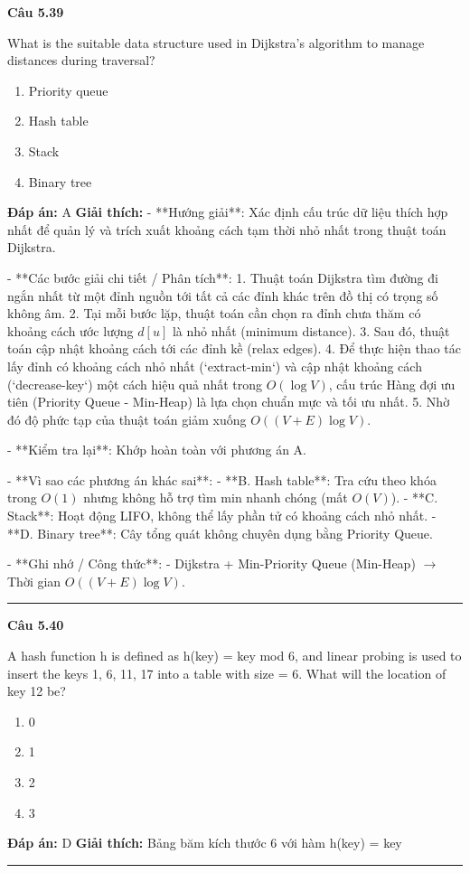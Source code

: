 \documentclass[11pt,a4paper]{article}
\newenvironment{question}[1]{%
  \par\vspace{1em}\noindent\textbf{\large Câu #1}\par\vspace{0.4em}
}{%
  \par\vspace{1em}\hrule\vspace{0.6em}
}
\newenvironment{choices}{%
  \begin{enumerate}[label=\textbf{\Alph*.},leftmargin=2.2em,itemsep=2pt,topsep=3pt]
}{%
  \end{enumerate}
}
\newcommand{\choice}{\item}
\begin{document}
\begin{question}{5.39}
What is the suitable data structure used in Dijkstra's algorithm to manage distances during traversal?
\begin{choices}
\choice Priority queue
\choice Hash table
\choice Stack
\choice Binary tree
\end{choices}
\textbf{Đáp án:} A
\textbf{Giải thích:} - **Hướng giải**:
  Xác định cấu trúc dữ liệu thích hợp nhất để quản lý và trích xuất khoảng cách tạm thời nhỏ nhất trong thuật toán Dijkstra.

- **Các bước giải chi tiết / Phân tích**:
  1. Thuật toán Dijkstra tìm đường đi ngắn nhất từ một đỉnh nguồn tới tất cả các đỉnh khác trên đồ thị có trọng số không âm.
  2. Tại mỗi bước lặp, thuật toán cần chọn ra đỉnh chưa thăm có khoảng cách ước lượng \(d[u]\) là nhỏ nhất (minimum distance).
  3. Sau đó, thuật toán cập nhật khoảng cách tới các đỉnh kề (relax edges).
  4. Để thực hiện thao tác lấy đỉnh có khoảng cách nhỏ nhất (`extract-min`) và cập nhật khoảng cách (`decrease-key`) một cách hiệu quả nhất trong \(O(\log V)\), cấu trúc Hàng đợi ưu tiên (Priority Queue - Min-Heap) là lựa chọn chuẩn mực và tối ưu nhất.
  5. Nhờ đó độ phức tạp của thuật toán giảm xuống \(O((V + E) \log V)\).

- **Kiểm tra lại**:
  Khớp hoàn toàn với phương án A.

- **Vì sao các phương án khác sai**:
  - **B. Hash table**: Tra cứu theo khóa trong \(O(1)\) nhưng không hỗ trợ tìm min nhanh chóng (mất \(O(V)\)).
  - **C. Stack**: Hoạt động LIFO, không thể lấy phần tử có khoảng cách nhỏ nhất.
  - **D. Binary tree**: Cây tổng quát không chuyên dụng bằng Priority Queue.

- **Ghi nhớ / Công thức**:
  - Dijkstra + Min-Priority Queue (Min-Heap) \(\rightarrow\) Thời gian \(O((V + E) \log V)\).
\end{question}

\begin{question}{5.40}
A hash function h is defined as h(key) = key mod 6, and linear probing is used to insert the keys 1, 6, 11, 17 into a table with size = 6. What will the location of key 12 be?
\begin{choices}
\choice 0
\choice 1
\choice 2
\choice 3
\end{choices}
\textbf{Đáp án:} D
\textbf{Giải thích:} Bảng băm kích thước 6 với hàm h(key) = key %
\end{question}
\end{document}
